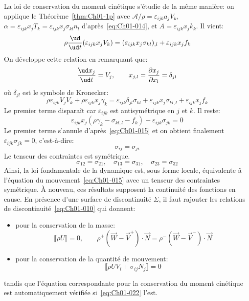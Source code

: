 La loi de conservation du moment cinétique s'étudie de la même manière: on applique le Théorème~\ref{thm:Ch01-1p} avec $\mathcal{A}/\rho=\varepsilon_{ijk}a_jV_k$, $\alpha=\varepsilon_{ijk}x_jT_k=\varepsilon_{ijk}x_j\sigma_{kl}n_l$ d'après~\eqref{eq:Ch01-014}, et $A=\varepsilon_{ijk}x_jk_k$.
Il vient:
\begin{equation*}
    \rho \frac{\ud}{\ud t}(\varepsilon_{ijk}x_jV_k)=(\varepsilon_{ijk}x_j\sigma_{kl})_{,l}+\varepsilon_{ijk}x_jf_k
\end{equation*}
On développe cette relation en remarquant que:
\begin{equation*}
    \frac{\ud x_j}{\ud t}=V_j, \qquad x_{j,l}=\frac{\partial x_j}{\partial x_l}=\delta_{jl}
\end{equation*}
où $\delta_{jl}$ est le symbole de Kronecker:
\begin{equation*}
    \rho \varepsilon_{ijk}V_jV_k+\rho\varepsilon_{ijk}x_j\gamma_k=\varepsilon_{ijk}\delta_{jl}\sigma_{kl}+\varepsilon_{ijk}x_j\sigma_{kl,l}+ \varepsilon_{ijk}x_jf_k
\end{equation*}
Le premier terme disparaît car $\varepsilon_{ijk}$ est antisymétrique en $j$ et $k$.
Il reste:
\begin{equation*} 
    \varepsilon_{ijk}x_j(\rho\gamma_k-\sigma_{kl,l}-f_k)-\varepsilon_{ijk}\sigma_{jk}=0
\end{equation*}
Le premier terme s'annule d'après~\eqref{eq:Ch01-015} et on obtient finalement $\varepsilon_{ijk}\sigma_{jk}=0$, c'est-à-dire:
\begin{equation}
    \sigma_{ij}=\sigma_{ji}
    \label{eq:Ch01-019}
\end{equation}
Le tenseur des contraintes est symétrique.
\begin{displaymath}
    \sigma_{12} = \sigma_{21}, \quad \sigma_{13}= \sigma_{31}, \quad \sigma_{23} = \sigma_{32}
\end{displaymath}
Ainsi, la loi fondamentale de la dynamique est, sous forme locale, équivalente â l'équation du mouvement~\eqref{eq:Ch01-015} avec un tenseur des contraintes symétrique.
\`A nouveau, ces résultats supposent la continuité des fonctions en cause.
En présence d'une surface de discontinuité $\Sigma$, il faut rajouter les relations de discontinuité~\eqref{eq:Ch01-010} qui donnent:
\begin{itemize}
     \item pour la conservation de la masse:
        \begin{equation}
            \llbracket \rho U \rrbracket=0, \qquad \rho^+(\vec{W}-\vec{V}^+)\cdot \vec{N} =\rho^-(\vec{W}-\vec{V}^-)\cdot \vec{N}
            \label{eq:Ch01-020}
        \end{equation}
    \item pour la conservation de la quantité de mouvement:
    \begin{equation}
        \llbracket \rho U V_i +\sigma_{ij}N_j \rrbracket=0
        \label{eq:Ch01-021}
    \end{equation}
\end{itemize}
tandis que l'équation correspondante pour la conservation du moment cinétique est automatiquement vérifiée si~\eqref{eq:Ch01-022} l'est.

